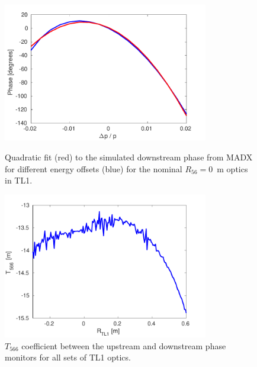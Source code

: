 \begin{figure}
  \centering
  \includegraphics[width=0.8\textwidth]{Figures/propagation/madxT566Fit}
  \caption{Quadratic fit (red) to the simulated downstream phase from MADX for different energy offsets (blue) for the nominal \(R_{56}=0\)~m optics in TL1.}
  \label{f:madxT566Fit}

  \includegraphics[width=0.8\textwidth]{Figures/propagation/t566TotVsr56TL1}
  \caption{\(T_{566}\) coefficient between the upstream and downstream phase monitors for all sets of TL1 optics.}
  \label{f:t566TotVsr56TL1}
\end{figure}


